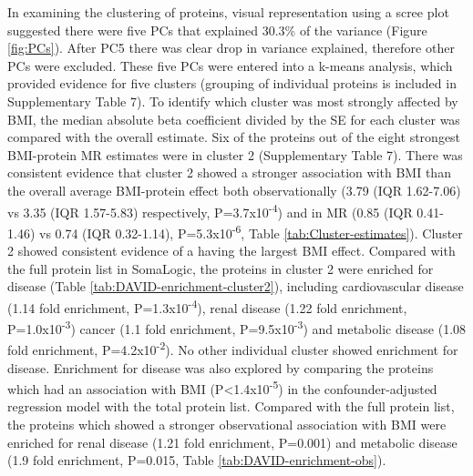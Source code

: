 \documentclass[11pt,twoside]{bristolthesis}
\begin{document}
In examining the clustering of proteins, visual representation using a scree plot suggested there were five PCs that explained 30.3\% of the variance (Figure \ref{fig:PCs}). After PC5 there was clear drop in variance explained, therefore other PCs were excluded. These five PCs were entered into a k-means analysis, which provided evidence for five clusters (grouping of individual proteins is included in Supplementary Table 7). To identify which cluster was most strongly affected by BMI, the median absolute beta coefficient divided by the SE for each cluster was compared with the overall estimate. Six of the proteins out of the eight strongest BMI-protein MR estimates were in cluster 2 (Supplementary Table 7). There was consistent evidence that cluster 2 showed a stronger association with BMI than the overall average BMI-protein effect both observationally (3.79 (IQR 1.62-7.06) vs 3.35 (IQR 1.57-5.83) respectively, P=3.7x10\textsuperscript{-4}) and in MR (0.85 (IQR 0.41-1.46) vs 0.74 (IQR 0.32-1.14), P=5.3x10\textsuperscript{-6}, Table \ref{tab:Cluster-estimates}). Cluster 2 showed consistent evidence of a having the largest BMI effect. Compared with the full protein list in SomaLogic, the proteins in cluster 2 were enriched for disease (Table \ref{tab:DAVID-enrichment-cluster2}), including cardiovascular disease (1.14 fold enrichment, P=1.3x10\textsuperscript{-4}), renal disease (1.22 fold enrichment, P=1.0x10\textsuperscript{-3}) cancer (1.1 fold enrichment, P=9.5x10\textsuperscript{-3}) and metabolic disease (1.08 fold enrichment, P=4.2x10\textsuperscript{-2}). No other individual cluster showed enrichment for disease. Enrichment for disease was also explored by comparing the proteins which had an association with BMI (P\textless1.4x10\textsuperscript{-5}) in the confounder-adjusted regression model with the total protein list. Compared with the full protein list, the proteins which showed a stronger observational association with BMI were enriched for renal disease (1.21 fold enrichment, P=0.001) and metabolic disease (1.9 fold enrichment, P=0.015, Table \ref{tab:DAVID-enrichment-obs}).
\end{document}

